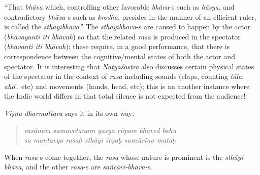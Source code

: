 “That \textsl{bhāva} which, controlling other favorable \textsl{bhāva}-s such as \textsl{hāsya}, and contradictory \textsl{bhāva}-s such as \textsl{krodha}, presides in the manner of an efficient ruler, is called the \textsl{sthāyibhāva}.” The \textsl{sthāyibhāva}-s are caused to happen by the actor (\textsl{bhāvayanti iti bhāvah}) so that the related \textsl{rasa} is produced in the spectator (\textsl{bhavanti iti bhāvah}); these require, in a good performance, that there is correspondence between the cognitive/mental states of both the actor and spectator. It is interesting that \textsl{Nāṭyaśāstra} also discusses certain physical states of the spectator in the context of \textsl{rasa} including sounds (claps, counting \textsl{tāla}, \textsl{aho}!, etc) and movements (hands, head, etc); this is an another instance where the Indic world differs in that total silence is not expected from the audience!

\textsl{Viṣṇu-dharmottara} says it in its own way:
\begin{quote}
\textsl{rasānam samavetanam yasya rūpam bhaved bahu}\\
\textsl{sa mantavyo rasaḥ sthāyi śeṣaḥ sancārino mataḥ}
\end{quote}

When \textsl{rasa}-s come together, the \textsl{rasa} whose nature is prominent is the \textsl{sthāyi-bhāva}, and the other \textsl{rasa}-s are \textsl{sañcāri-bhāva-}s.

